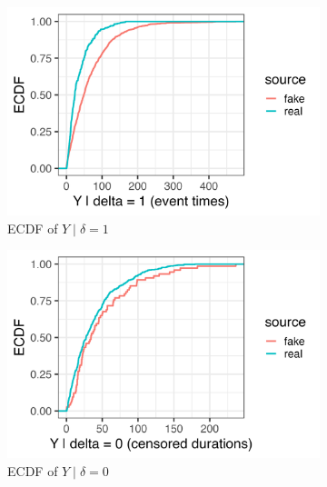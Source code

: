 \begin{figure}[H]
\centering
\begin{subfigure}[t]{0.3\textwidth}
  \centering
  \includegraphics[width=\linewidth]{images/ppc_event_ecdf_A1000.png}  %
  \caption{{\small ECDF of $Y \mid \delta=1$}}
  \label{fig:ecdf-event_a1000}
\end{subfigure}\hfill
\begin{subfigure}[t]{0.3\textwidth}
  \centering
  \includegraphics[width=\linewidth]{images/ppc_censored_ecdf_A1000.png} 
  \caption{{\small ECDF of $Y \mid \delta=0$}}
  \label{fig:ecdf-cens_a1000}
\end{subfigure}\hfill
\begin{subfigure}[t]{0.37\textwidth}
  \centering

\end{subfigure}
\end{figure}
